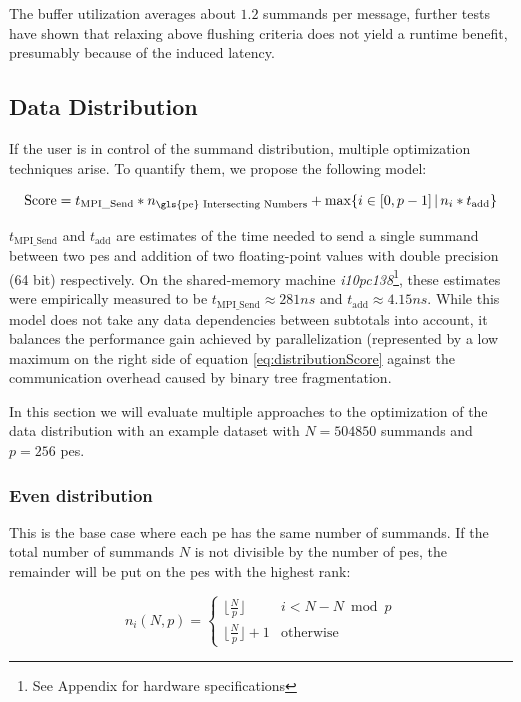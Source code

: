 The buffer utilization averages about $1.2$ summands per message, further tests have shown that relaxing above flushing criteria does not
yield a runtime benefit, presumably because of the induced latency.

\subsection{Data Distribution}
\label{sec:DataDistribution}

If the user is in control of the summand distribution, multiple optimization techniques arise. To quantify them, we propose the following model:

\begin{equation}
\label{eq:distributionScore}
\textrm{Score} = t_{\textrm{MPI\_Send}} * n_{\textrm{\gls{pe} Intersecting Numbers}} + \max \{ i \in [0, p - 1]\, |\, n_i * t_{\textrm{add}} \}
\end{equation}

$t_{\textrm{MPI\_Send}}$ and $t_\textrm{add}$ are estimates of the time needed to send a single summand between two \glspl{pe} and addition of two
floating-point values with double precision (64 bit) respectively. On the shared-memory machine \textit{i10pc138}\footnote{See Appendix for hardware specifications}, these
estimates were empirically measured to be $t_{\textrm{MPI\_Send}} \approx 281ns$ and $t_\textrm{add} \approx 4.15ns$. While this model does not
take any data dependencies between subtotals into account, it balances the performance gain achieved by parallelization (represented by a low maximum
on the right side of equation \eqref{eq:distributionScore} against the communication overhead caused by binary tree fragmentation. 

In this section we will evaluate multiple approaches to the optimization of the data distribution with an example dataset with $N = 504 850$ summands
and $p = 256$ \glspl{pe}.


\subsubsection{Even distribution}
This is the base case where each \gls{pe} has the same number of summands. If the total number of summands $N$ is not divisible by the number of
\glspl{pe}, the remainder will be put on the \glspl{pe} with the highest rank:

\begin{equation}
\label{eq:evenDistribution}
n_i (N, p) = \begin{cases}
\lfloor \tfrac{N}{p} \rfloor & i < N - N \bmod p \\
\lfloor \tfrac{N}{p} \rfloor + 1 & \textrm{otherwise}
\end{cases}
\end{equation}

